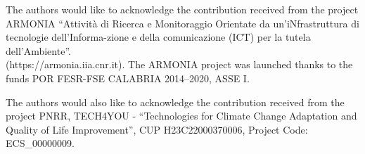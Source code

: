 \documentclass[10pt]{../style_src/imeko_acta}
\begin{document}
The authors would like to acknowledge the contribution received from the project ARMONIA ``Attività di Ricerca e Monitoraggio Orientate da un’iNfrastruttura di tecnologie dell’Informa-zione e della comunicazione (ICT) per la tutela dell’Ambiente''.\\ (https://armonia.iia.cnr.it). The ARMONIA project was launched thanks to the funds POR FESR-FSE CALABRIA 2014–2020, ASSE I. 

The authors would also like to acknowledge the contribution received from the project
PNRR, TECH4YOU - ``Technologies for Climate Change Adaptation and Quality of Life Improvement'', CUP H23C22000370006, Project Code: ECS\_00000009.



\end{document}

